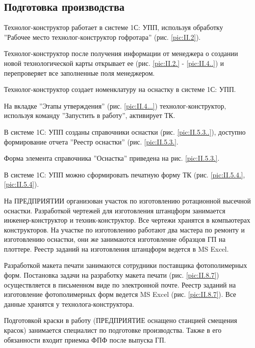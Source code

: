 \subsection{Подготовка производства}
\label{bp:Prepare}


Технолог-конструктор работает в системе 1С: УПП, используя обработку ''Рабочее место технолог-конструктор гофротара'' (рис. \ref{pic:II.2}).

Технолог-конструктор после получения информации от менеджера о создании новой технологической карты открывает ее (рис. \ref{pic:II.2.} - \ref{pic:II.4..}) и перепроверяет все заполненные поля менеджером.

Технолог-конструктор создает номенклатуру на оснастку в системе 1С: УПП. 

На вкладке ''Этапы утверждения'' (рис. \ref{pic:II.4...}) технолог-конструктор, используя команду ''Запустить в работу'', активирует ТК.

В системе 1С: УПП созданы справочники оснастки (рис. \ref{pic:II.5.3..}), доступно формирование отчета ''Реестр оснастки'' (рис. \ref{pic:II.5.3.}. 

Форма элемента справочника ''Оснастка'' приведена на рис. \ref{pic:II.5.3.}.

В системе 1С: УПП можно сформировать печатную форму ТК (рис. \ref{pic:II.5.4.}, \ref{pic:II.5.4}).

На ПРЕДПРИЯТИИ организован участок по изготовлению ротационной высечной оснастки. Разработкой чертежей для изготовления штанцформ занимается инженер-конструктор и техник-конструктор. Все чертежи хранятся в компьютерах конструкторов. 
На участке по изготовлению работают два мастера по ремонту и изготовлению оснастки, они же занимаются изготовление образцов ГП на плоттере. Реестр заданий на изготовления штанцформ ведется в MS Excel.

Разработкой макета печати занимаются сотрудники поставщика фотополимерных форм. Постановка задачи на разработку макета печати (рис. \ref{pic:II.8.7}) осуществляется в письменном виде по электронной почте. Реестр заданий на изготовление фотополимерных форм ведется MS Excel (рис. \ref{pic:II.8.7}). Все данные хранятся у технолога-конструктора.

Подготовкой краски в работу (ПРЕДПРИЯТИЕ оснащено станцией смещения красок) занимается специалист по подготовке производства. Также в его обязанности входит приемка ФПФ после выпуска ГП.




\clearpage

